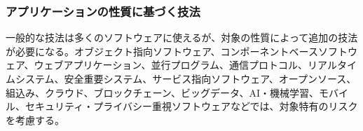 \subsubsection{アプリケーションの性質に基づく技法}
一般的な技法は多くのソフトウェアに使えるが、対象の性質によって追加の技法が必要になる。オブジェクト指向ソフトウェア、コンポーネントベースソフトウェア、ウェブアプリケーション、並行プログラム、通信プロトコル、リアルタイムシステム、安全重要システム、サービス指向ソフトウェア、オープンソース、組込み、クラウド、ブロックチェーン、ビッグデータ、AI・機械学習、モバイル、セキュリティ・プライバシー重視ソフトウェアなどでは、対象特有のリスクを考慮する。
